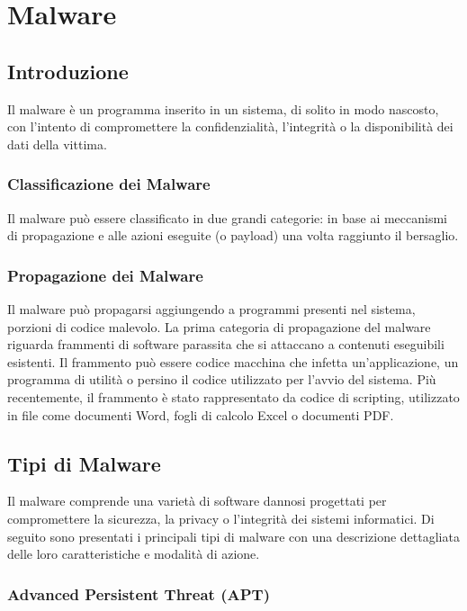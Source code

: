 \chapter{Malware}

\section{Introduzione}

Il malware è un programma inserito in un sistema, di solito in modo nascosto, con l'intento di compromettere la confidenzialità, l'integrità o la disponibilità dei dati della vittima.

\subsection{Classificazione dei Malware}

Il malware può essere classificato in due grandi categorie: in base ai meccanismi di propagazione e alle azioni eseguite (o payload) una volta raggiunto il bersaglio.

\subsection{Propagazione dei Malware}

Il malware può propagarsi aggiungendo a programmi presenti nel sistema, porzioni di codice malevolo. La prima categoria di propagazione del malware riguarda frammenti di software parassita che si attaccano a contenuti eseguibili esistenti. Il frammento può essere codice macchina che infetta un'applicazione, un programma di utilità o persino il codice utilizzato per l'avvio del sistema. Più recentemente, il frammento è stato rappresentato da codice di scripting, utilizzato in file come documenti Word, fogli di calcolo Excel o documenti PDF.

\section{Tipi di Malware}

Il malware comprende una varietà di software dannosi progettati per compromettere la sicurezza, la privacy o l'integrità dei sistemi informatici. Di seguito sono presentati i principali tipi di malware con una descrizione dettagliata delle loro caratteristiche e modalità di azione.

\subsection{Advanced Persistent Threat (APT)}

